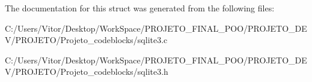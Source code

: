 The documentation for this struct was generated from the following files\-:\begin{DoxyCompactItemize}
\item 
C\-:/\-Users/\-Vitor/\-Desktop/\-Work\-Space/\-P\-R\-O\-J\-E\-T\-O\-\_\-\-F\-I\-N\-A\-L\-\_\-\-P\-O\-O/\-P\-R\-O\-J\-E\-T\-O\-\_\-\-D\-E\-V/\-P\-R\-O\-J\-E\-T\-O/\-Projeto\-\_\-codeblocks/sqlite3.\-c\item 
C\-:/\-Users/\-Vitor/\-Desktop/\-Work\-Space/\-P\-R\-O\-J\-E\-T\-O\-\_\-\-F\-I\-N\-A\-L\-\_\-\-P\-O\-O/\-P\-R\-O\-J\-E\-T\-O\-\_\-\-D\-E\-V/\-P\-R\-O\-J\-E\-T\-O/\-Projeto\-\_\-codeblocks/sqlite3.\-h\end{DoxyCompactItemize}
